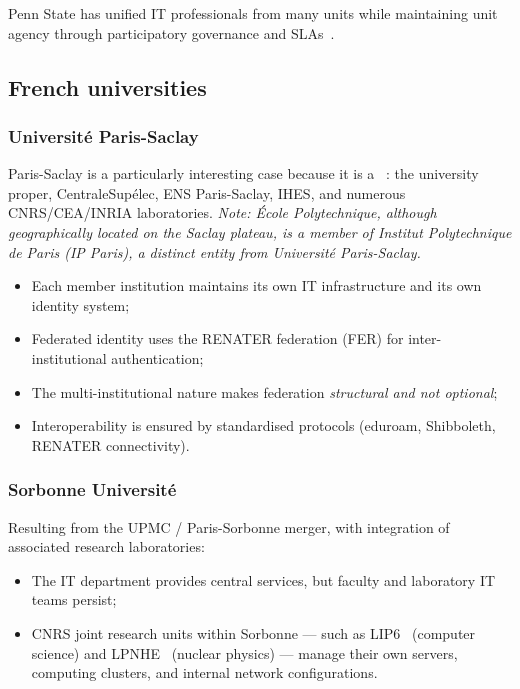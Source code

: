 Penn State has unified IT professionals from many units while
maintaining unit agency through participatory governance and
SLAs~\cite{pennstate-it}.

\subsection{French universities}

\subsubsection{Université Paris-Saclay}

Paris-Saclay is a particularly interesting case because it is a
~\cite{paris-saclay-network}: the
university proper, CentraleSupélec, ENS Paris-Saclay, IHES, and
numerous CNRS/CEA/INRIA laboratories.
\emph{Note: École Polytechnique, although geographically located on the
Saclay plateau, is a member of Institut Polytechnique de Paris (IP Paris),
a distinct entity from Université Paris-Saclay.}

\begin{itemize}[nosep]
    \item Each member institution maintains its own IT infrastructure
    and its own identity system;
    \item Federated identity uses the RENATER federation (FER) for
    inter-institutional authentication;
    \item The multi-institutional nature makes federation
    \emph{structural and not optional};
    \item Interoperability is ensured by standardised protocols
    (\gls{eduroam}, Shibboleth, RENATER connectivity).
\end{itemize}

\subsubsection{Sorbonne Université}

Resulting from the UPMC / Paris-Sorbonne merger, with integration of
associated research laboratories:

\begin{itemize}[nosep]
    \item The IT department provides central services, but faculty
    and laboratory IT teams persist;
    \item CNRS joint research units within Sorbonne ---
    such as LIP6~\cite{sorbonne-lip6} (computer science) and
    LPNHE~\cite{sorbonne-lpnhe} (nuclear physics) --- manage their own
    servers, computing clusters, and internal network configurations.
\end{itemize}

